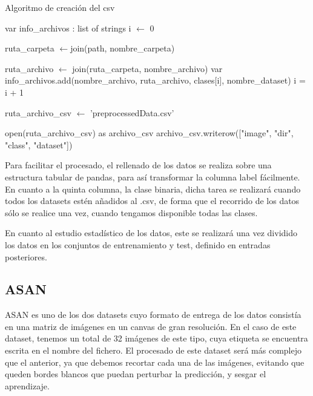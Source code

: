 \begin{algorithm}[H]
		\caption{Algoritmo de creación del csv}
		\label{isiccrear}
		\begin{algorithmic}[1]
			
		 \State var info\_archivos : list of strings
		 \State i  $\gets$ 0
		
			\State ruta\_carpeta $\gets$join(path, nombre\_carpeta)
			
		
						  \State ruta\_archivo $\gets$ join(ruta\_carpeta, nombre\_archivo)
						\State var info\_archivos.add(nombre\_archivo, ruta\_archivo, clases[i], nombre\_dataset)
					\EndIf
					\State i = i + 1
				\EndFor
		 	\EndIf
		\EndFor		
		
	
		\State ruta\_archivo\_csv $\gets$ 'preprocessedData.csv'	
		
		\State open(ruta\_archivo\_csv) as archivo\_csv
		 \State archivo\_csv.writerow(["image", "dir", "class", "dataset"])  
		 
		 \EndProcedure
	\end{algorithmic}
\end{algorithm}

Para facilitar el procesado, el rellenado de los datos se realiza sobre una estructura tabular de pandas, para así transformar la columna label fácilmente.
En cuanto a la quinta columna, la clase binaria, dicha tarea se realizará cuando todos los datasets estén añadidos al .csv, de forma que el recorrido de los datos sólo se realice una vez, cuando tengamos disponible todas las clases. 

En cuanto al estudio estadístico de los datos, este se realizará una vez dividido los datos en los conjuntos de entrenamiento y test, definido en entradas posteriores.

\subsection{ASAN}

ASAN es uno de los dos datasets cuyo formato de entrega de los datos consistía en una matriz de imágenes en un canvas de gran resolución. En el caso de este dataset, tenemos un total de 32 imágenes de este tipo, cuya etiqueta se encuentra escrita en el nombre del fichero.
El procesado de este dataset será más complejo que el anterior, ya que debemos recortar cada una de las imágenes, evitando que queden bordes blancos que puedan perturbar la predicción, y sesgar el aprendizaje.

